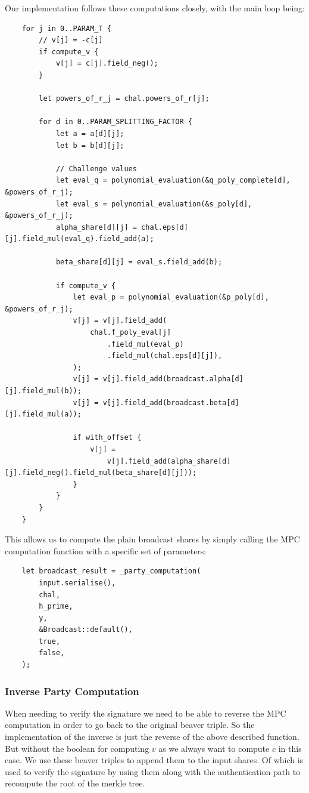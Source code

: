 \documentclass[11pt]{report}
\theoremstyle{definition}
\theoremstyle{plain}
\begin{document}
Our implementation follows these computations closely, with the main loop being:
\begin{verbatim}
    for j in 0..PARAM_T {
        // v[j] = -c[j]
        if compute_v {
            v[j] = c[j].field_neg();
        }

        let powers_of_r_j = chal.powers_of_r[j];

        for d in 0..PARAM_SPLITTING_FACTOR {
            let a = a[d][j];
            let b = b[d][j];

            // Challenge values
            let eval_q = polynomial_evaluation(&q_poly_complete[d], &powers_of_r_j);
            let eval_s = polynomial_evaluation(&s_poly[d], &powers_of_r_j);
            alpha_share[d][j] = chal.eps[d][j].field_mul(eval_q).field_add(a);

            beta_share[d][j] = eval_s.field_add(b);

            if compute_v {
                let eval_p = polynomial_evaluation(&p_poly[d], &powers_of_r_j);
                v[j] = v[j].field_add(
                    chal.f_poly_eval[j]
                        .field_mul(eval_p)
                        .field_mul(chal.eps[d][j]),
                );
                v[j] = v[j].field_add(broadcast.alpha[d][j].field_mul(b));
                v[j] = v[j].field_add(broadcast.beta[d][j].field_mul(a));

                if with_offset {
                    v[j] =
                        v[j].field_add(alpha_share[d][j].field_neg().field_mul(beta_share[d][j]));
                }
            }
        }
    }
\end{verbatim}

This allows us to compute the plain broadcast shares by simply calling the MPC computation function with a specific set of parameters:
\begin{verbatim}
    let broadcast_result = _party_computation(
        input.serialise(),
        chal,
        h_prime,
        y,
        &Broadcast::default(),
        true,
        false,
    );
\end{verbatim}

\subsubsection{Inverse Party Computation}
When needing to verify the signature we need to be able to reverse the MPC computation in order to go back to the original beaver triple. So the implementation of the inverse is just the reverse of the above described function. But without the boolean for computing $v$ as we always want to compute $c$ in this case. We use these beaver triples to append them to the input shares. Of which is used to verify the signature by using them along with the authentication path to recompute the root of the merkle tree.
\end{document}
